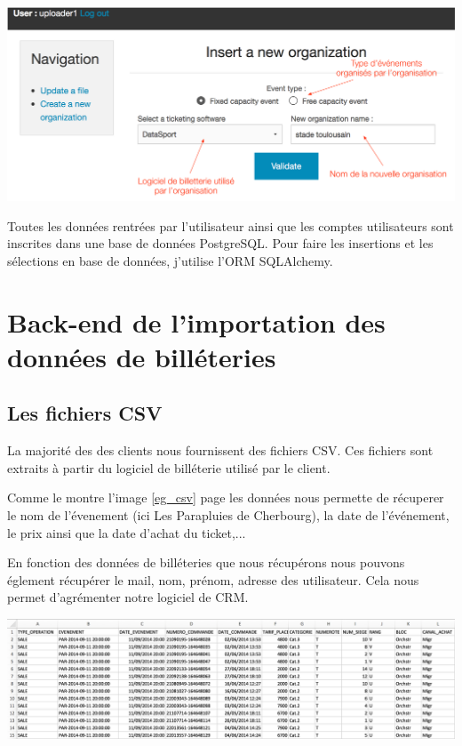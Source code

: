 \begin{center}
\includegraphics[scale=0.55]{images/front2.png}
\label{front_orga}
\end{center}

Toutes les données rentrées par l'utilisateur ainsi que les comptes utilisateurs sont inscrites dans une base de données PostgreSQL. Pour faire les insertions et les sélections en base de données, j'utilise l'ORM SQLAlchemy.

\section{Back-end de l'importation des données de billéteries}
\subsection{Les fichiers CSV}
La majorité des des clients nous fournissent des fichiers CSV. Ces fichiers sont extraits à partir du logiciel de billéterie utilisé par le client.

Comme le montre l'image \ref{eg_csv} page \pageref{eg_csv} les données nous permette de récuperer le nom de l'évenement (ici Les Parapluies de Cherbourg), la date de l'événement, le prix ainsi que la date d'achat du ticket,...

En fonction des données de billéteries que nous récupérons nous pouvons églement récupérer le mail, nom, prénom, adresse des utilisateur. Cela nous permet d'agrémenter notre logiciel de CRM. %

\begin{center}
\includegraphics[scale=0.42]{Images/eg_csv1.png}
\label{eg_csv}
\end{center}


